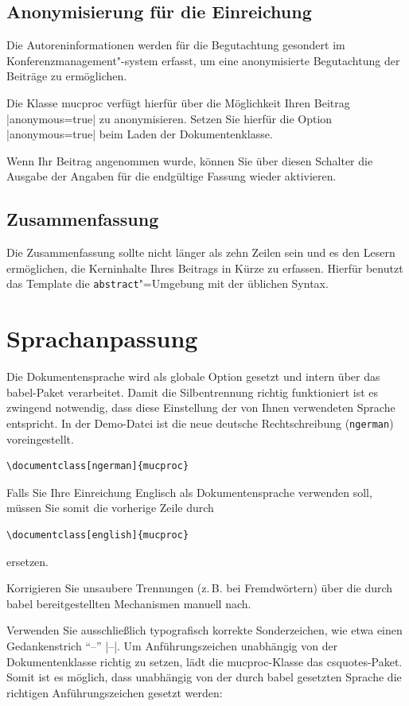 \documentclass[ngerman,forcefinal
	]{mucproc}
\newenvironment{minted}[2][]{\endgraf\verbatim}{\endverbatim}
\begin{document}
\subsection{Anonymisierung für die Einreichung}
Die Autoreninformationen werden für die Begutachtung gesondert im Konferenzmanagement"-system erfasst, um eine anonymisierte Begutachtung der Beiträge zu ermöglichen.

Die Klasse \textsf{mucproc} verfügt hierfür über die Möglichkeit Ihren Beitrag |anonymous=true| zu anonymisieren. Setzen Sie hierfür die Option |anonymous=true| beim Laden der Dokumentenklasse.

Wenn Ihr Beitrag angenommen wurde, können Sie über diesen Schalter die Ausgabe der Angaben für die endgültige Fassung wieder aktivieren.

\subsection{Zusammenfassung}
Die Zusammenfassung sollte nicht länger als zehn Zeilen sein und es den Lesern  ermöglichen, die Kerninhalte Ihres Beitrags in Kürze zu erfassen. Hierfür benutzt das Template die \texttt{abstract}"=Umgebung mit der üblichen Syntax.


\section{Sprachanpassung}
Die Dokumentensprache wird als globale Option gesetzt und intern über das \textsf{babel}-Paket verarbeitet. Damit die Silbentrennung richtig funktioniert ist es zwingend notwendig, dass diese Einstellung der von Ihnen verwendeten Sprache entspricht. In der Demo-Datei ist die neue deutsche Rechtschreibung (\texttt{ngerman}) voreingestellt.
\begin{verbatim}
\documentclass[ngerman]{mucproc}
\end{verbatim}
Falls Sie Ihre Einreichung Englisch als Dokumentensprache verwenden soll, müssen Sie somit die vorherige Zeile durch
\begin{verbatim}
\documentclass[english]{mucproc}
\end{verbatim}
ersetzen.

Korrigieren Sie unsaubere Trennungen (z.\,B. bei Fremdwörtern) über die durch \textsf{babel} bereitgestellten Mechanismen manuell nach.

Verwenden Sie ausschließlich typografisch korrekte Sonderzeichen, wie etwa einen Gedankenstrich \enquote{--} |--|. Um Anführungszeichen unabhängig von der Dokumentenklasse richtig zu setzen, lädt die \textsf{mucproc}-Klasse das \textsf{csquotes}-Paket. Somit ist es möglich, dass unabhängig von der durch \textsf{babel} gesetzten Sprache die richtigen Anführungszeichen gesetzt werden:
\end{document}
